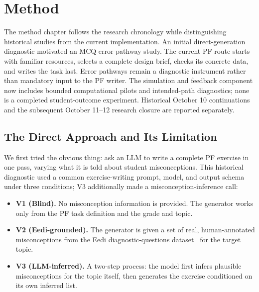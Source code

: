 \section{Method}

The method chapter follows the research chronology while distinguishing historical studies from the current implementation. An initial direct-generation diagnostic motivated an MCQ error-pathway study. The current PF route starts with familiar resources, selects a complete design brief, checks its concrete data, and writes the task last. Error pathways remain a diagnostic instrument rather than mandatory input to the PF writer. The simulation and feedback component now includes bounded computational pilots and intended-path diagnostics; none is a completed student-outcome experiment. Historical October 10 continuations and the subsequent October 11--12 research closure are reported separately.

\subsection{The Direct Approach and Its Limitation}

We first tried the obvious thing: ask an LLM to write a complete PF exercise in one pass, varying what it is told about student misconceptions. This historical diagnostic used a common exercise-writing prompt, model, and output schema under three conditions; V3 additionally made a misconception-inference call:

\begin{itemize}
    \item \textbf{V1 (Blind).} No misconception information is provided. The generator works only from the PF task definition and the grade and topic.
    \item \textbf{V2 (Eedi-grounded).} The generator is given a set of real, human-annotated misconceptions from the Eedi diagnostic-questions dataset~\cite{wang2021eedi} for the target topic.
    \item \textbf{V3 (LLM-inferred).} A two-step process: the model first infers plausible misconceptions for the topic itself, then generates the exercise conditioned on its own inferred list.
\end{itemize}


